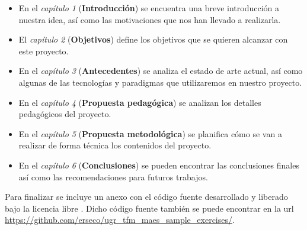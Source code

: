 \begin{itemize}
  \item En el \textit{capítulo 1} (\textbf{Introducción}) se encuentra una breve introducción a nuestra idea, así como las motivaciones que nos han llevado a realizarla.
  \item El \textit{capítulo 2} (\textbf{Objetivos}) define los objetivos que se quieren alcanzar con este proyecto.
  \item En el \textit{capítulo 3} (\textbf{Antecedentes}) se analiza el estado de arte actual, así como algunas de las tecnologías y paradigmas que utilizaremos en nuestro proyecto.
  \item En el \textit{capítulo 4} (\textbf{Propuesta pedagógica}) se analizan los detalles pedagógicos del proyecto.
  \item En el \textit{capítulo 5} (\textbf{Propuesta metodológica}) se planifica cómo se van a realizar de forma técnica los contenidos del proyecto.
  \item En el \textit{capítulo 6} (\textbf{Conclusiones}) se pueden encontrar las conclusiones finales así como las recomendaciones para futuros trabajos.

\end{itemize}


\bigskip
Para finalizar se incluye un anexo con el código fuente desarrollado y liberado bajo la licencia libre \cite{gplv3}. Dicho código fuente también se puede encontrar en la url \url{https://github.com/erseco/ugr_tfm_maes_sample_exercises/}.








